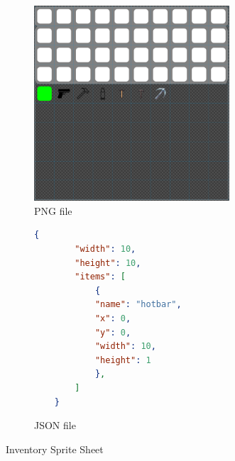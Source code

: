 \begin{figure}[H]
    \centering
    \begin{subfigure}{0.45\textwidth}
        \centering
        \includegraphics[width=0.8\textwidth]{chapters/system_architecture/sections/two_dimensional_graphics/resources/SpriteSheet.png}
        \caption{PNG file}
        \label{fig:inventory_texture}
    \end{subfigure}\hfill
    \begin{subfigure}{0.45\textwidth}
    \begin{lstlisting}[language=json,firstline=1]
    {
        "width": 10,
        "height": 10,
        "items": [
            {
            "name": "hotbar",
            "x": 0,
            "y": 0,
            "width": 10,
            "height": 1
            },
        ]
    }
    \end{lstlisting}

    \caption{JSON file}
    \label{lst:inventory_sprite_sheet_json}
    \end{subfigure}

    \caption{Inventory Sprite Sheet}
\end{figure}